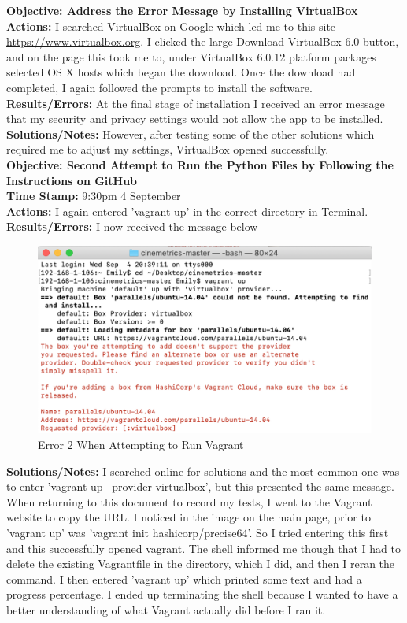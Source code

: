 \documentclass{article}
\begin{document}
\textbf{Objective: Address the Error Message by Installing VirtualBox}\\
\textbf{Actions:} I searched VirtualBox on Google which led me to this site \url{https://www.virtualbox.org}. I clicked the large Download VirtualBox 6.0 button, and on the page this took me to, under VirtualBox 6.0.12 platform packages selected OS X hosts which began the download. Once the download had completed, I again followed the prompts to install the software.\\
\textbf{Results/Errors:} At the final stage of installation I received an error message that my security and privacy settings would not allow the app to be installed. \\
\textbf{Solutions/Notes:} However, after testing some of the other solutions which required me to adjust my settings, VirtualBox opened successfully.\\

\textbf{Objective: Second Attempt to Run the Python Files by Following the Instructions on GitHub}\\
\textbf{Time Stamp:} 9:30pm 4 September\\
\textbf{Actions:} I again entered 'vagrant up' in the correct directory in Terminal.\\
\textbf{Results/Errors:} I now received the message below\\
\begin{figure}[htp]
    \centering
    \includegraphics[width=12cm]{Vagrant_Image_2.png}
    \caption{Error 2 When Attempting to Run Vagrant}
\end{figure}

\textbf{Solutions/Notes:} I searched online for solutions and the most common one was to enter 'vagrant up --provider virtualbox', but this presented the same message. When returning to this document to record my tests, I went to the Vagrant website to copy the URL. I noticed in the image on the main page, prior to 'vagrant up' was 'vagrant init hashicorp/precise64'. So I tried entering this first and this successfully opened vagrant. The shell informed me though that I had to delete the existing Vagrantfile in the directory, which I did, and then I reran the command. I then entered 'vagrant up' which printed some text and had a progress percentage. I ended up terminating the shell because I wanted to have a better understanding of what Vagrant actually did before I ran it.\\
\end{document}

